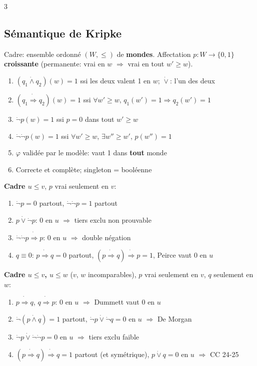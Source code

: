 \documentclass[12pt, a4paper]{article}
\begin{document}
\begin{multicols*}{3}
	\subsection{Sémantique de Kripke}
	Cadre: ensemble ordonné $(W,\leq)$ de \textbf{mondes}. Affectation $p:W\to\{0,1\}$ \textbf{croissante} (permanente: vrai en $w$ $\Rightarrow$ vrai en tout $w'\geq w$).
	\begin{enumerate}[\roman*.]
		\item $(q_1\dot\wedge q_2)(w)=1$ ssi les deux valent 1 en $w$; $\dot\vee$: l'un des deux
		\item $(q_1\dot\Rightarrow q_2)(w)=1$ ssi $\forall w'\geq w$, $q_1(w')=1\Rightarrow q_2(w')=1$
		\item $\dot\neg p(w)=1$ ssi $p=0$ dans tout $w'\geq w$
		\item $\dot\neg\dot\neg p(w)=1$ ssi $\forall w'\geq w$, $\exists w''\geq w'$, $p(w'')=1$
		\item $\varphi$ validée par le modèle: vaut 1 dans \textbf{tout} monde
		\item Correcte et complète; singleton = booléenne
	\end{enumerate}
	\textbf{Cadre $u\leq v$}, $p$ vrai seulement en $v$:
	\begin{enumerate}[\roman*.]
		\item $\dot\neg p=0$ partout, $\dot\neg\dot\neg p=1$ partout
		\item $p\dot\vee\dot\neg p$: 0 en $u$ $\Rightarrow$ tiers exclu non prouvable
		\item $\dot\neg\dot\neg p\dot\Rightarrow p$: 0 en $u$ $\Rightarrow$ double négation
		\item $q\equiv0$: $p\dot\Rightarrow q=0$ partout, $(p\dot\Rightarrow q)\dot\Rightarrow p=1$, Peirce vaut 0 en $u$
	\end{enumerate}
	\textbf{Cadre $u\leq v$, $u\leq w$} ($v$, $w$ incomparables), $p$ vrai seulement en $v$, $q$ seulement en $w$:
	\begin{enumerate}[\roman*.]
		\item $p\dot\Rightarrow q$, $q\dot\Rightarrow p$: 0 en $u$ $\Rightarrow$ Dummett vaut 0 en $u$
		\item $\dot\neg(p\dot\wedge q)=1$ partout, $\dot\neg p\dot\vee\dot\neg q=0$ en $u$ $\Rightarrow$ De Morgan
		\item $\dot\neg p\dot\vee\dot\neg\dot\neg p=0$ en $u$ $\Rightarrow$ tiers exclu faible
		\item $(p\dot\Rightarrow q)\dot\Rightarrow q=1$ partout (et symétrique), $p\dot\vee q=0$ en $u$ $\Rightarrow$ CC 24-25
	\end{enumerate}


\end{multicols*}
\end{document}
